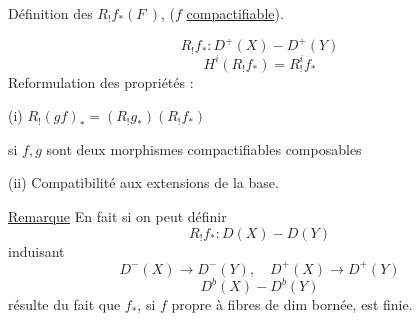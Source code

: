 Définition des $R_!f_*(F^\cdot)$, ($f$ \uline{compactifiable}).

\[
R_!f_*:D^+(X)-D^+(Y)
\]
\[
H^i(R_!f_*)=R^i_!f_*
\]
Reformulation des propriétés  :

(i) $R_!(gf)_*=(R_!g_*)(R_!f_*)$

si $f,g$ sont deux morphismes compactifiables composables

(ii) Compatibilité aux extensions de la base.

\uline{Remarque} En fait si  on peut définir
\[
R_!f_*:D(X)-D(Y)
\]
induisant
\[
D^-(X)\longrightarrow D^-(Y),\quad D^+(X)\longrightarrow D^+(Y)
\]
\[
D^b(X)-D^b(Y)
\]
 résulte du fait que $f_*$, si $f$ propre à fibres de dim bornée, est  finie.

